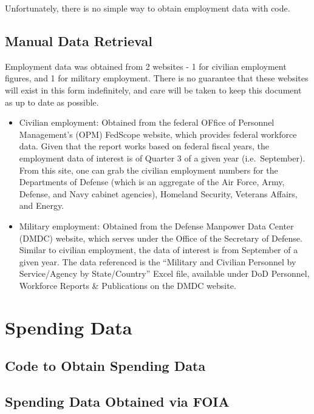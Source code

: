 \documentclass[
]{book}
\begin{document}
Unfortunately, there is no simple way to obtain employment data with code.

\hypertarget{manual-data-retrieval}{%
\subsection{Manual Data Retrieval}\label{manual-data-retrieval}}

Employment data was obtained from 2 websites - 1 for civilian employment figures, and 1 for military employment. There is no guarantee that these websites will exist in this form indefinitely, and care will be taken to keep this document as up to date as possible.

\begin{itemize}
\item
  Civilian employment: Obtained from the federal OFfice of Personnel Management's (OPM) FedScope website, which provides federal workforce data. Given that the report works based on federal fiscal years, the employment data of interest is of Quarter 3 of a given year (i.e.~September). From this site, one can grab the civilian employment numbers for the Departments of Defense (which is an aggregate of the Air Force, Army, Defense, and Navy cabinet agencies), Homeland Security, Veterans Affairs, and Energy.
\item
  Military employment: Obtained from the Defense Manpower Data Center (DMDC) website, which serves under the Office of the Secretary of Defense. Similar to civilian employment, the data of interest is from September of a given year. The data referenced is the ``Military and Civilian Personnel by Service/Agency by State/Country'' Excel file, available under DoD Personnel, Workforce Reports \& Publications on the DMDC website.
\end{itemize}

\hypertarget{spending-data}{%
\section{Spending Data}\label{spending-data}}

\hypertarget{code-to-obtain-spending-data}{%
\subsection{Code to Obtain Spending Data}\label{code-to-obtain-spending-data}}

\hypertarget{spending-data-obtained-via-foia}{%
\subsection{Spending Data Obtained via FOIA}\label{spending-data-obtained-via-foia}}
\end{document}

